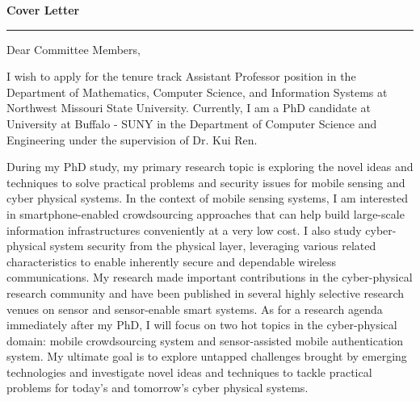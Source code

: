 \documentclass[11pt]{letter} %
\begin{document}

\begin{letter}{} 



\begin{center}
\Large\bf Cover Letter %
\vspace{20pt} \hrule height 1pt %
\end{center} 

\signature{Si Chen\\
Department of Computer Science and Engineering\\
University at Buffalo - SUNY\\
301 Davis Hall, Buffalo NY\\
(716) 335-8052} %


\opening{Dear Committee Members,} 
 
I wish to apply for the tenure track Assistant Professor position in the Department of Mathematics, Computer Science, and Information Systems at Northwest Missouri State University. Currently, I am a PhD candidate at University at Buffalo - SUNY in the Department of Computer Science and Engineering under the supervision of Dr. Kui Ren. 

During my PhD study, my primary research topic is exploring the novel ideas and techniques to solve practical problems and security issues for mobile sensing and cyber physical systems. In the context of mobile sensing systems, I am interested in smartphone-enabled crowdsourcing approaches that can help build large-scale information infrastructures conveniently at a very low cost. I also study cyber-physical system security from the physical layer, leveraging various related characteristics to enable inherently secure and dependable wireless communications. My research made important contributions in the cyber-physical research community and have been published in several highly selective research venues on sensor and sensor-enable smart systems. As for a research agenda immediately after my PhD, I will focus on two hot topics in the cyber-physical domain: mobile crowdsourcing system and sensor-assisted mobile authentication system. My ultimate goal is to explore untapped challenges brought by emerging technologies and investigate novel ideas and techniques to tackle practical problems for today's and tomorrow's cyber physical systems.


\end{letter}
\end{document}
